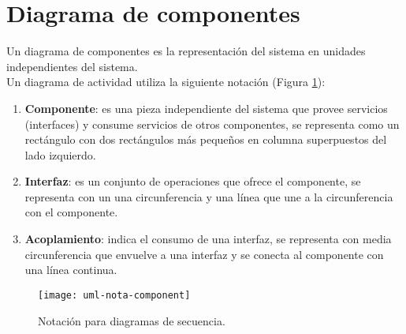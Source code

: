 \section{Diagrama de componentes}\label{sec:uml-comp}
Un diagrama de componentes es la representación del sistema en unidades independientes del sistema\cite{UMLClassroom, SoftwareEngineeringUML}.\\
Un diagrama de actividad utiliza la siguiente notación\cite{UMLClassroom, SoftwareEngineeringUML} (Figura \ref{fig:uml-nota-component}):
\begin{enumerate}
  \item \textbf{Componente}: es una pieza independiente del sistema que provee servicios (interfaces) y consume servicios de otros componentes, se representa como un rectángulo con dos rectángulos más pequeños en columna superpuestos del lado izquierdo.
  \item \textbf{Interfaz}: es un conjunto de operaciones que ofrece el componente, se representa con un una circunferencia y una línea que une a la circunferencia con el componente.
  \item \textbf{Acoplamiento}: indica el consumo de una interfaz, se representa con media circunferencia que envuelve a una interfaz y se conecta al componente con una línea continua.
\end{enumerate}
\begin{figure}[h]
  \centering
  \texttt{[image: uml-nota-component]}
  \caption{Notación para diagramas de secuencia\cite{SoftwareEngineeringUML}.}
  \label{fig:uml-nota-component}
\end{figure}
\pagebreak
